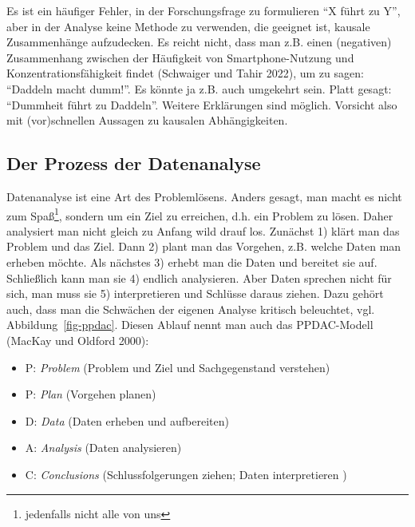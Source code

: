 \documentclass[
  a4paper,
  DIV=11]{scrreprt}
\providecommand{\tightlist}{%
  \setlength{\itemsep}{0pt}\setlength{\parskip}{0pt}}\usepackage{longtable,booktabs,array}
\theoremstyle{definition}
\theoremstyle{definition}
\theoremstyle{definition}
\theoremstyle{remark}
\begin{document}
\begin{tcolorbox}[enhanced jigsaw, leftrule=.75mm, opacitybacktitle=0.6, colback=white, colframe=quarto-callout-caution-color-frame, coltitle=black, colbacktitle=quarto-callout-caution-color!10!white, opacityback=0, left=2mm, breakable, titlerule=0mm, toptitle=1mm, bottomtitle=1mm, rightrule=.15mm, title=\textcolor{quarto-callout-caution-color}{\faFire}\hspace{0.5em}{Vorsicht}, arc=.35mm, bottomrule=.15mm, toprule=.15mm]

Es ist ein häufiger Fehler, in der Forschungsfrage zu formulieren ``X
führt zu Y'', aber in der Analyse keine Methode zu verwenden, die
geeignet ist, kausale Zusammenhänge aufzudecken. Es reicht nicht, dass
man z.B. einen (negativen) Zusammenhang zwischen der Häufigkeit von
Smartphone-Nutzung und Konzentrationsfähigkeit findet (Schwaiger und
Tahir 2022), um zu sagen: ``Daddeln macht dumm!''. Es könnte ja z.B.
auch umgekehrt sein. Platt gesagt: ``Dummheit führt zu Daddeln''.
Weitere Erklärungen sind möglich. Vorsicht also mit (vor)schnellen
Aussagen zu kausalen Abhängigkeiten.

\end{tcolorbox}

\subsection{Der Prozess der
Datenanalyse}\label{der-prozess-der-datenanalyse}

Datenanalyse ist eine Art des Problemlösens. Anders gesagt, man macht es
nicht zum Spaß\footnote{jedenfalls nicht alle von uns}, sondern um ein
Ziel zu erreichen, d.h. ein Problem zu lösen. Daher analysiert man nicht
gleich zu Anfang wild drauf los. Zunächst 1) klärt man das Problem und
das Ziel. Dann 2) plant man das Vorgehen, z.B. welche Daten man erheben
möchte. Als nächstes 3) erhebt man die Daten und bereitet sie auf.
Schließlich kann man sie 4) endlich analysieren. Aber Daten sprechen
nicht für sich, man muss sie 5) interpretieren und Schlüsse daraus
ziehen. Dazu gehört auch, dass man die Schwächen der eigenen Analyse
kritisch beleuchtet, vgl. Abbildung~\ref{fig-ppdac}. Diesen Ablauf nennt
man auch das PPDAC-Modell (MacKay und Oldford 2000):

\begin{itemize}
\tightlist
\item
  P: \emph{Problem} (Problem und Ziel und Sachgegenstand verstehen)
\item
  P: \emph{Plan} (Vorgehen planen)
\item
  D: \emph{Data} (Daten erheben und aufbereiten)
\item
  A: \emph{Analysis} (Daten analysieren)
\item
  C: \emph{Conclusions} (Schlussfolgerungen ziehen; Daten interpretieren
  )
\end{itemize}
\end{document}
